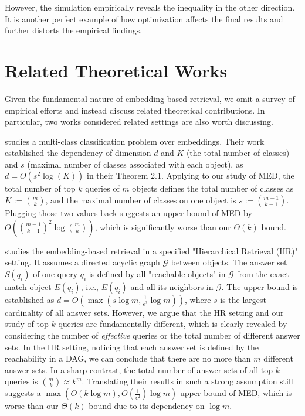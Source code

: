 However, the simulation empirically reveals the inequality in the other direction. It is another perfect example of how optimization affects the final results and further distorts the empirical findings.


\section{Related Theoretical Works}\label{sec:related}

Given the fundamental nature of embedding-based retrieval, we omit a survey of empirical efforts and instead discuss related theoretical contributions.
In particular, two works considered related settings are also worth discussing.

\citet{guo2019breaking} studies a multi-class classification problem over embeddings. Their work established the dependency of dimension $d$ and $K$ (the total number of classes) and $s$ (maximal number of classes associated with each object), as $d=O(s^2 \log (K))$ in their Theorem 2.1. Applying to our study of MED, the total number of top $k$ queries of $m$ objects defines the total number of classes as $K:=\binom{m}{k}$, and the maximal number of classes on one object is $s:=\binom{m-1}{k-1}$. Plugging those two values back suggests an upper bound of MED by $O(\binom{m-1}{k-1}^2 \log \binom{m}{k})$, which is significantly worse than our $\Theta(k)$ bound.

\citet{you2025hierarchical} studies the embedding-based retrieval in a specified "Hierarchical Retrieval (HR)" setting. It assumes a directed acyclic graph $\mathcal{G}$ between objects. The answer set $S(q_i)$ of one query $q_i$ is defined by all "reachable objects" in $\mathcal{G}$ from the exact match object $E(q_i)$, i.e., $E(q_i)$ and all its neighbors in $\mathcal{G}$. The upper bound is established as $d = O(\max(s\log m, \frac{1}{\epsilon^2} \log m))$, where $s$ is the largest cardinality of all answer sets. However, we argue that the HR setting and our study of top-$k$ queries are fundamentally different, which is clearly revealed by considering the number of \textit{effective} queries or the total number of different answer sets.  In the HR setting, noticing that each answer set is defined by the reachability in a DAG, we can conclude that there are no more than $m$ different answer sets. In a sharp contrast, the total number of answer sets of all top-$k$ queries is $\binom{m}{k} \approx k^m$. Translating their results in such a strong assumption still suggests a $\max(O(k\log m), O(\frac{1}{\epsilon^2})\log m)$ upper bound of MED, which is worse than our $\Theta(k)$ bound due to its dependency on $\log m$.

